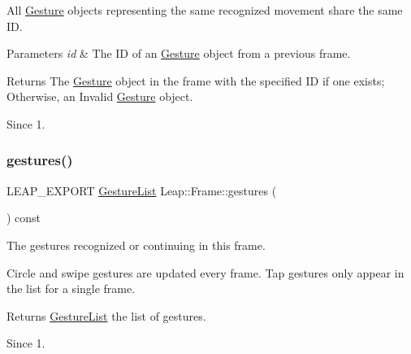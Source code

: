 \begin{DoxyCodeInclude}
\end{DoxyCodeInclude}


All \hyperlink{class_leap_1_1_gesture}{Gesture} objects representing the same recognized movement share the same ID. 
\begin{DoxyParams}{Parameters}
{\em id} & The ID of an \hyperlink{class_leap_1_1_gesture}{Gesture} object from a previous frame. \\
\hline
\end{DoxyParams}
\begin{DoxyReturn}{Returns}
The \hyperlink{class_leap_1_1_gesture}{Gesture} object in the frame with the specified ID if one exists; Otherwise, an Invalid \hyperlink{class_leap_1_1_gesture}{Gesture} object. 
\end{DoxyReturn}
\begin{DoxySince}{Since}
1. 
\end{DoxySince}
\mbox{\label{class_leap_1_1_frame_a09f7850e3b1a92585f319c74e189cc0e}} 
\subsubsection{\texorpdfstring{gestures()}{gestures()}\hspace{0.1cm}{\footnotesize\ttfamily [1/2]}}
{\footnotesize\ttfamily L\+E\+A\+P\+\_\+\+E\+X\+P\+O\+RT \hyperlink{class_leap_1_1_gesture_list}{Gesture\+List} Leap\+::\+Frame\+::gestures (\begin{DoxyParamCaption}{ }\end{DoxyParamCaption}) const}

The gestures recognized or continuing in this frame.


\begin{DoxyCodeInclude}
\end{DoxyCodeInclude}


Circle and swipe gestures are updated every frame. Tap gestures only appear in the list for a single frame.

\begin{DoxyReturn}{Returns}
\hyperlink{class_leap_1_1_gesture_list}{Gesture\+List} the list of gestures. 
\end{DoxyReturn}
\begin{DoxySince}{Since}
1. 
\end{DoxySince}
\mbox{\label{class_leap_1_1_frame_a7bd248e86b0ea9f4b683cd42ba715413}} 
